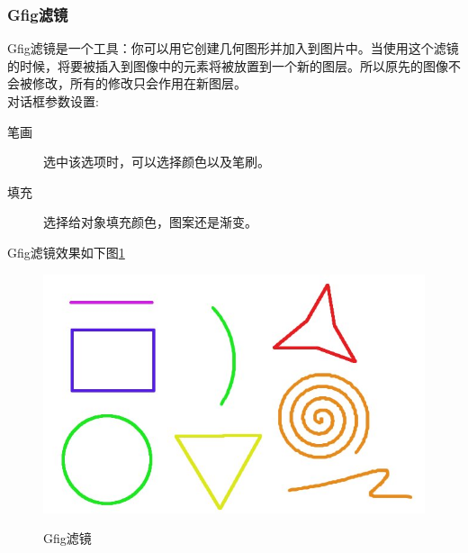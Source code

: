 \subsubsection{Gfig滤镜}\label{filters:render:gfig}
Gfig滤镜是一个工具：你可以用它创建几何图形并加入到图片中。当使用这个滤镜的时候，将要被插入到图像中的元素将被放置到一个新的图层。所以原先的图像不会被修改，所有的修改只会作用在新图层。\\
对话框参数设置:
\begin{description}
\item[笔画]	选中该选项时，可以选择颜色以及笔刷。
\item[填充]	选择给对象填充颜色，图案还是渐变。
\end{description}
Gfig滤镜效果如下图\ref{filters:render:gfig:figure}
\begin{figure}[!htbp]
	\centering
	\caption{Gfig滤镜}
	\includegraphics[scale=0.5]{figs/rendering_gfig.jpg} 
    	\label{filters:render:gfig:figure}
\end{figure}






\clearpage
